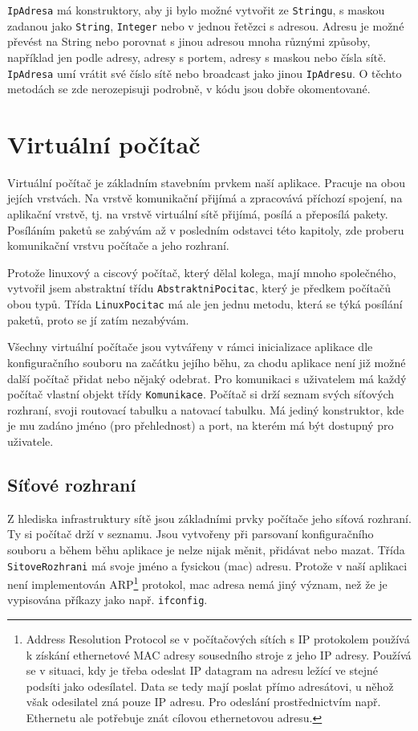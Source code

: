 \verb|IpAdresa| má konstruktory, aby ji bylo možné vytvořit ze \verb|Stringu|, s maskou zadanou jako \verb|String|, \verb|Integer| nebo v jednou řetězci s adresou. Adresu je možné převést na String nebo porovnat s jinou adresou mnoha různými způsoby, například jen podle adresy, adresy s portem, adresy s maskou nebo čísla sítě. \verb|IpAdresa| umí vrátit své číslo sítě nebo broadcast jako jinou \verb|IpAdresu|. O těchto metodách se zde nerozepisuji podrobně, v kódu jsou dobře okomentované.




\section{Virtuální počítač}

Virtuální počítač je základním stavebním prvkem naší aplikace. Pracuje na obou jejích vrstvách. Na vrstvě komunikační přijímá a zpracovává příchozí spojení, na aplikační vrstvě, tj. na vrstvě virtuální sítě přijímá, posílá a přeposílá pakety. Posíláním paketů se zabývám až v posledním odstavci této kapitoly, zde proberu komunikační vrstvu počítače a jeho rozhraní.

Protože linuxový a ciscový počítač, který dělal kolega, mají mnoho společného, vytvořil jsem abstraktní třídu \verb|AbstraktniPocitac|, který je předkem počítačů obou typů. Třída \verb|LinuxPocitac| má ale jen jednu metodu, která se týká posílání paketů, proto se jí zatím nezabývám.

Všechny virtuální počítače jsou vytvářeny v rámci inicializace aplikace dle konfiguračního souboru na začátku jejího běhu, za chodu aplikace není již možné další počítač přidat nebo nějaký odebrat. Pro komunikaci s uživatelem má každý počítač vlastní objekt třídy \verb|Komunikace|. Počítač si drží seznam svých síťových rozhraní, svoji routovací tabulku a natovací tabulku. Má jediný konstruktor, kde je mu zadáno jméno (pro přehlednost) a port, na kterém má být dostupný pro uživatele.


\subsection{Síťové rozhraní}

Z hlediska infrastruktury sítě jsou základními prvky počítače jeho síťová rozhraní. Ty si počítač drží v seznamu. Jsou vytvořeny při parsovaní konfiguračního souboru a během běhu aplikace je nelze nijak měnit, přidávat nebo mazat. Třída \verb|SitoveRozhrani| má svoje jméno a fysickou (mac) adresu. Protože v naší aplikaci není implementován ARP\footnote{Address Resolution Protocol se v počítačových sítích s IP protokolem používá k získání ethernetové MAC adresy sousedního stroje z jeho IP adresy. Používá se v situaci, kdy je třeba odeslat IP datagram na adresu ležící ve stejné podsíti jako odesílatel. Data se tedy mají poslat přímo adresátovi, u něhož však odesilatel zná pouze IP adresu. Pro odeslání prostřednictvím např. Ethernetu ale potřebuje znát cílovou ethernetovou adresu.\cite{wiki:arp}} protokol, mac adresa nemá jiný význam, než že je vypisována příkazy jako např. \verb|ifconfig|.

